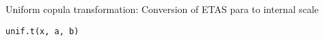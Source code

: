 \documentclass[letterpaper]{book}
\begin{document}
%
\begin{Description}\relax
Uniform copula transformation: Conversion of ETAS para to internal scale
\end{Description}
%
\begin{Usage}
\begin{verbatim}
unif.t(x, a, b)
\end{verbatim}
\end{Usage}
%
\begin{Arguments}
\begin{ldescription}
\item[\code{b}] 
\end{ldescription}
\end{Arguments}
\printindex{}
\end{document}

